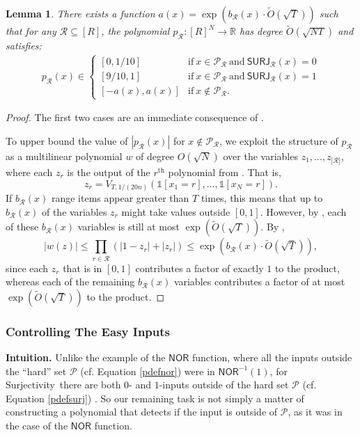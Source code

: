 \documentclass[11pt, letterpaper, fleqn]{article}
\newtheorem{lemma}[theorem]{Lemma}
\theoremstyle{plain}
\newcommand{\R}{\mathbb{R}}
\renewcommand{\P}{\mathcal{P}}
\newcommand{\SURJ}{\mathsf{ SURJ}}
\newcommand{\Surjectivity}{Surjectivity}
\newcommand{\NOR}{\mathsf{ NOR}}
\newcommand{\tO}{\tilde{O}}
\newcommand{\id}{{\mathds{1}}}
\newcommand{\Rcal}{\mathcal{R}}
\begin{document}
\begin{lemma}\label{lem:promiseSURJ} \label{lem:boundonprcal}
There exists a function $a(x) =  \exp\left(b_\Rcal\left(x\right)\cdot \tO\left(\sqrt{T}\right)\right)$ such that for any $\Rcal \subseteq [R]$, the polynomial $p_\Rcal:[R]^N\to \R$ has degree $\tO(\sqrt{NT})$ and satisfies:
\begin{align*}
p_\Rcal(x) \in \begin{cases} [0,1/10] &\mathrm{if}~ x\in\P_\Rcal ~\mathrm{and}~ \SURJ_\Rcal(x)=0\\
[9/10,1] &\mathrm{if}~ x\in\P_\Rcal ~\mathrm{and}~ \SURJ_\Rcal(x)=1\\
[-a(x), a(x)]& \mathrm{if}~ x \notin \P_\Rcal.\end{cases}
\end{align*}
\end{lemma}

\begin{proof}
The first two cases are an immediate consequence of .

To upper bound the value of $|p_\Rcal(x)|$ for $x\notin \P_\Rcal$, we exploit the structure of $p_\Rcal$ as a multilinear polynomial $w$ of degree $O(\sqrt{N})$ over the variables $z_1,\ldots,z_{|\Rcal|}$, where each $z_r$ is the output of the $r^\mathrm{th}$ polynomial from . That is, 
$$z_r = V_{T, 1/(20n)}\left(\id[x_1 = r], \dots, \id[x_N = r]\right).$$ 
If $b_\Rcal(x)$ range items appear greater than $T$ times, this means that up to $b_\Rcal(x)$ of the variables $z_r$ might take values outside $[0,1]$. 
However, by , each of these $b_\Rcal(x)$ variables is still at most ${\exp(\tO(\sqrt{T}))}$. By ,
\[|w(z)| \le \prod_{r \in \Rcal} \left(|1 - z_r| + |z_r|\right) \le \exp\left(b_\Rcal(x) \cdot \tO\left(\sqrt{T}\right)\right),\]
since each $z_r $ that is in $[0, 1]$ contributes a factor of exactly $1$ to the product, whereas each of the remaining $b_\Rcal(x)$ variables contributes a factor of at most ${\exp(\tO(\sqrt{T}))}$ to the product.
\end{proof}



\subsubsection{Controlling The Easy Inputs} \label{sec:surj-easy-inputs}

\noindent \textbf{Intuition.} Unlike the example of the $\NOR$ function, where all the inputs outside the ``hard'' set $\P$ (cf. Equation \eqref{pdefnor}) were in $\NOR^{-1}(1)$, for \Surjectivity\ there are both $0$- and $1$-inputs outside of the hard set $\P$  (cf. Equation \eqref{pdefsurj}) . 
So our remaining task is not simply a matter of constructing a polynomial that detects 
if the input is outside of $\P$, as it was in the case of the $\NOR$ function.
\end{document}
